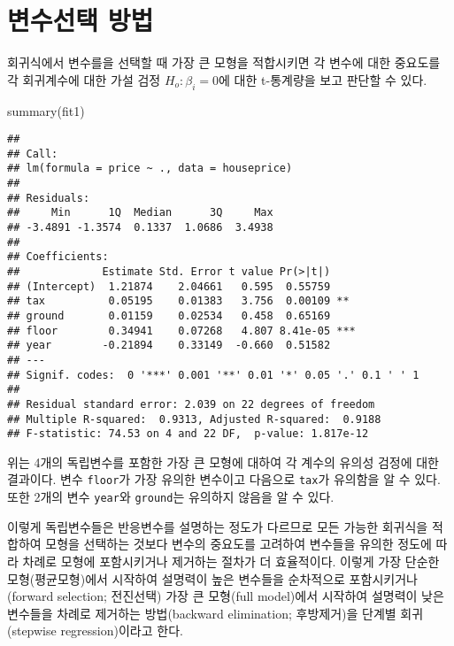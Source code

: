 \documentclass[
]{book}
\newenvironment{Shaded}{\begin{snugshade}}{\end{snugshade}}
\newcommand{\FunctionTok}[1]{\textcolor[rgb]{0.00,0.00,0.00}{#1}}
\newcommand{\NormalTok}[1]{#1}
\begin{document}
\hypertarget{uxbcc0uxc218uxc120uxd0dd-uxbc29uxbc95}{%
\section{변수선택 방법}\label{uxbcc0uxc218uxc120uxd0dd-uxbc29uxbc95}}

회귀식에서 변수를을 선택할 때 가장 큰 모형을 적합시키면 각 변수에 대한 중요도를 각 회귀계수에 대한
가설 검정 \(H_o: \beta_i=0\)에 대한 t-통계량을 보고 판단할 수 있다.

\begin{Shaded}
\begin{Highlighting}[]
\FunctionTok{summary}\NormalTok{(fit1)}
\end{Highlighting}
\end{Shaded}

\begin{verbatim}
## 
## Call:
## lm(formula = price ~ ., data = houseprice)
## 
## Residuals:
##     Min      1Q  Median      3Q     Max 
## -3.4891 -1.3574  0.1337  1.0686  3.4938 
## 
## Coefficients:
##             Estimate Std. Error t value Pr(>|t|)    
## (Intercept)  1.21874    2.04661   0.595  0.55759    
## tax          0.05195    0.01383   3.756  0.00109 ** 
## ground       0.01159    0.02534   0.458  0.65169    
## floor        0.34941    0.07268   4.807 8.41e-05 ***
## year        -0.21894    0.33149  -0.660  0.51582    
## ---
## Signif. codes:  0 '***' 0.001 '**' 0.01 '*' 0.05 '.' 0.1 ' ' 1
## 
## Residual standard error: 2.039 on 22 degrees of freedom
## Multiple R-squared:  0.9313, Adjusted R-squared:  0.9188 
## F-statistic: 74.53 on 4 and 22 DF,  p-value: 1.817e-12
\end{verbatim}

위는 4개의 독립변수를 포함한 가장 큰 모형에 대하여 각 계수의 유의성 검정에 대한 결과이다.
변수 \texttt{floor}가 가장 유의한 변수이고 다음으로 \texttt{tax}가 유의함을 알 수 있다. 또한
2개의 변수 \texttt{year}와 \texttt{ground}는 유의하지 않음을 알 수 있다.

이렇게 독립변수들은 반응변수를 설명하는 정도가 다르므로 모든 가능한 회귀식을 적합하여 모형을 선택하는 것보다
변수의 중요도를 고려하여 변수들을 유의한 정도에 따라 차례로 모형에 포함시키거나 제거하는 절차가 더 효율적이다. 이렇게 가장 단순한 모형(평균모형)에서 시작하여 설명력이 높은 변수들을 순차적으로 포함시키거나(forward selection; 전진선택) 가장 큰 모형(full model)에서 시작하여 설명력이 낮은 변수들을
차례로 제거하는 방법(backward elimination; 후방제거)을 단계별 회귀(stepwise regression)이라고 한다.
\end{document}
